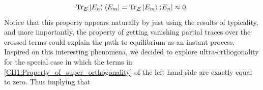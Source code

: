 \begin{equation}
\operatorname{Tr}_E \mathinner{|{E_n}\rangle}\mathinner{\langle{E_m}|} = \operatorname{Tr}_E \mathinner{|{E_m}\rangle}\mathinner{\langle{E_n}|} \approx  0.
\label{CH1:Property_of_super_orthogonality}
\end{equation}
Notice that this property appears naturally by just using the results of typicality, and more importantly, the property of getting vanishing partial traces over the crossed terms could explain the path to equilibrium as an instant process. Inspired on this interesting phenomena, we decided to explore ultra-orthogonality for the special case in which the terms in \eqref{CH1:Property_of_super_orthogonality} of the left hand side are exactly equal to zero. Thus implying that

